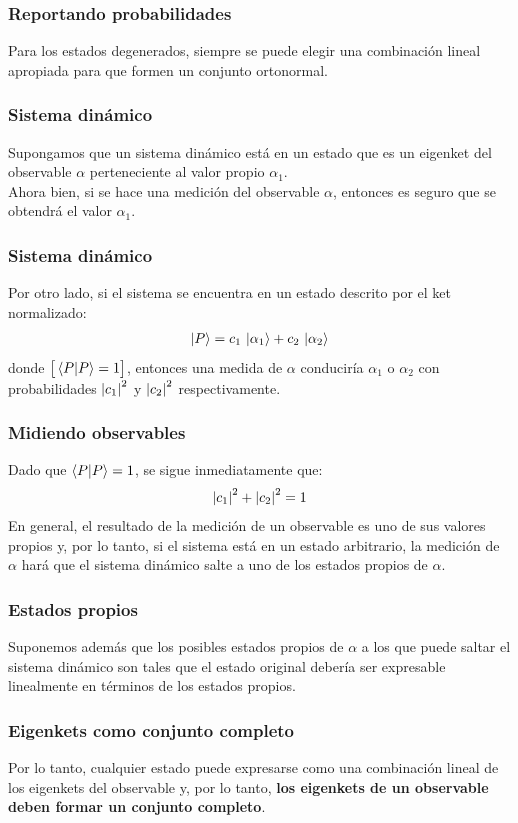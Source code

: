 \documentclass[12pt]{beamer}
\begin{document}
\begin{frame}
\frametitle{Reportando probabilidades}
Para los estados degenerados, siempre se puede elegir una combinación lineal apropiada para que formen un conjunto ortonormal.
\end{frame}
\begin{frame}
\frametitle{Sistema dinámico}
Supongamos que un sistema dinámico está en un estado que es un eigenket del observable $\alpha$ perteneciente al valor propio $\alpha_{1}$.
\\
\bigskip
\pause
Ahora bien, si se hace una medición del observable $\alpha$, entonces es seguro que se obtendrá el valor $\alpha_{1}$. 
\end{frame}
\begin{frame}
\frametitle{Sistema dinámico}
Por otro lado, si el sistema se encuentra en un estado descrito por el ket normalizado:
\pause
\begin{align*}
\ket{P} = c_{1} \, \ket{\alpha_{1}} + c_{2} \, \ket{\alpha_{2}}
\end{align*}
donde $\big[ \braket{P}{P} = 1 \big]$, \pause entonces una medida de $\alpha$ conduciría $\alpha_{1}$ o $\alpha_{2}$ con probabilidades $\abs{c_{1}}^{2}$ y $\abs{c_{2}}^{2}$ respectivamente.
\end{frame}
\begin{frame}
\frametitle{Midiendo observables}
Dado que $\braket{P}{P} = 1$, se sigue inmediatamente que:
\begin{align*}
\abs{c_{1}}^{2} + \abs{c_{2}}^{2} = 1
\end{align*}
\pause
En general, el resultado de la medición de un observable es uno de sus valores propios y, por lo tanto, si el sistema está en un estado arbitrario, la medición de $\alpha$ hará que el sistema dinámico salte a uno de los estados propios de $\alpha$.
\end{frame}
\begin{frame}
\frametitle{Estados propios}
Suponemos además que los posibles estados propios de $\alpha$ a los que puede saltar el sistema dinámico son tales que el estado original debería ser expresable linealmente en términos de los estados propios.
\end{frame}
\begin{frame}
\frametitle{Eigenkets como conjunto completo}
Por lo tanto, cualquier estado puede expresarse como una combinación lineal de los eigenkets del observable y, por lo tanto, \textbf{los eigenkets de un observable deben formar un conjunto completo}.
\end{frame}
\end{document}
